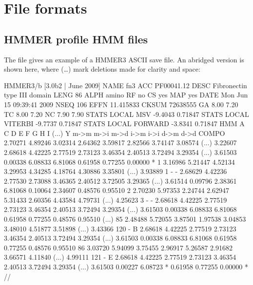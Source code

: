 \section{File formats}
\label{section:formats}


\subsection{HMMER profile HMM files}
\label{section:savefiles}

The file  gives an example of a HMMER3 ASCII
save file. An abridged version is shown here, where (\ldots) mark
deletions made for clarity and space:

\begin{tinysreoutput}
HMMER3/b [3.0b2 | June 2009]
NAME  fn3
ACC   PF00041.12
DESC  Fibronectin type III domain
LENG  86
ALPH  amino
RF    no
CS    yes
MAP   yes
DATE  Mon Jun 15 09:39:41 2009
NSEQ  106
EFFN  11.415833
CKSUM 72638555
GA    8.00 7.20
TC    8.00 7.20
NC    7.90 7.90
STATS LOCAL MSV       -9.4043  0.71847
STATS LOCAL VITERBI   -9.7737  0.71847
STATS LOCAL FORWARD   -3.8341  0.71847
HMM          A        C        D        E        F        G        H        I     (...)    Y   
            m->m     m->i     m->d     i->m     i->i     d->m     d->d
  COMPO   2.70271  4.89246  3.02314  2.64362  3.59817  2.82566  3.74147  3.08574  (...) 3.22607
          2.68618  4.42225  2.77519  2.73123  3.46354  2.40513  3.72494  3.29354  (...) 3.61503
          0.00338  6.08833  6.81068  0.61958  0.77255  0.00000        *
      1   3.16986  5.21447  4.52134  3.29953  4.34285  4.18764  4.30886  3.35801  (...) 3.93889      1 - -
          2.68629  4.42236  2.77530  2.73088  3.46365  2.40512  3.72505  3.29365  (...) 3.61514
          0.09796  2.38361  6.81068  0.10064  2.34607  0.48576  0.95510
      2   2.70230  5.97353  2.24744  2.62947  5.31433  2.60356  4.43584  4.79731  (...) 4.25623      3 - -
          2.68618  4.42225  2.77519  2.73123  3.46354  2.40513  3.72494  3.29354  (...) 3.61503
          0.00338  6.08833  6.81068  0.61958  0.77255  0.48576  0.95510
(...)
     85   2.48488  5.72055  3.87501  1.97538  3.04853  3.48010  4.51877  3.51898  (...) 3.43366    120 - B
          2.68618  4.42225  2.77519  2.73123  3.46354  2.40513  3.72494  3.29354  (...) 3.61503
          0.00338  6.08833  6.81068  0.61958  0.77255  0.48576  0.95510
     86   3.03720  5.94099  3.75455  2.96917  5.26587  2.91682  3.66571  4.11840  (...) 4.99111    121 - E
          2.68618  4.42225  2.77519  2.73123  3.46354  2.40513  3.72494  3.29354  (...) 3.61503
          0.00227  6.08723        *  0.61958  0.77255  0.00000        *
//
\end{tinysreoutput}

